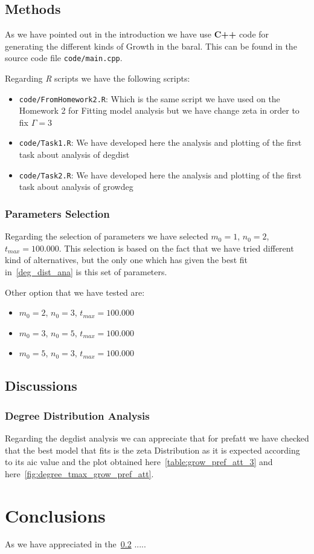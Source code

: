 \documentclass[12pt, a4paper]{article}
\begin{document}
\subsection{Methods}
As we have pointed out in the introduction we have use \textbf{C++} code for generating the different kinds of Growth in the \acrshort{baral}.
This can be found in the source code file \texttt{code/main.cpp}. 

Regarding \textit{R} scripts we have the following scripts:

\begin{itemize}
    \item \texttt{code/FromHomework2.R}: Which is the same script we have used on the Homework 2 for Fitting model analysis but we have change \acrshort{zeta} in order to fix $\Gamma = 3$
    \item \texttt{code/Task1.R}: We have developed here the analysis and plotting of the first task about analysis of \acrshort{degdist}
    \item \texttt{code/Task2.R}: We have developed here the analysis and plotting of the first task about analysis of \acrshort{growdeg}
\end{itemize}

\subsubsection{Parameters Selection}
Regarding the selection of parameters we have selected $m_0 = 1$, $n_0 = 2$, $t_{max} = 100.000$.
This selection is based on the fact that we have tried different kind of alternatives, but the only one which has given the best fit 
in~\ref{deg_dist_ana} is this set of parameters.

Other option that we have tested are:

\begin{itemize}
    \item $m_0 = 2$, $n_0 = 3$, $t_{max} = 100.000$
    \item $m_0 = 3$, $n_0 = 5$, $t_{max} = 100.000$
    \item $m_0 = 5$, $n_0 = 3$, $t_{max} = 100.000$
\end{itemize}

\subsection{Discussions}\label{sec:disc}
\subsubsection{Degree Distribution Analysis}
Regarding the \acrshort{degdist} analysis we can appreciate that for \acrshort{prefatt} we have checked that the best model that fits is the \acrshort{zeta} Distribution as
it is expected according to its \acrshort{aic} value and the plot obtained here~\ref{table:grow_pref_att_3} and here~\ref{fig:degree_tmax_grow_pref_att}.

\section{Conclusions}
As we have appreciated in the~\ref{sec:disc} .....
\end{document}
